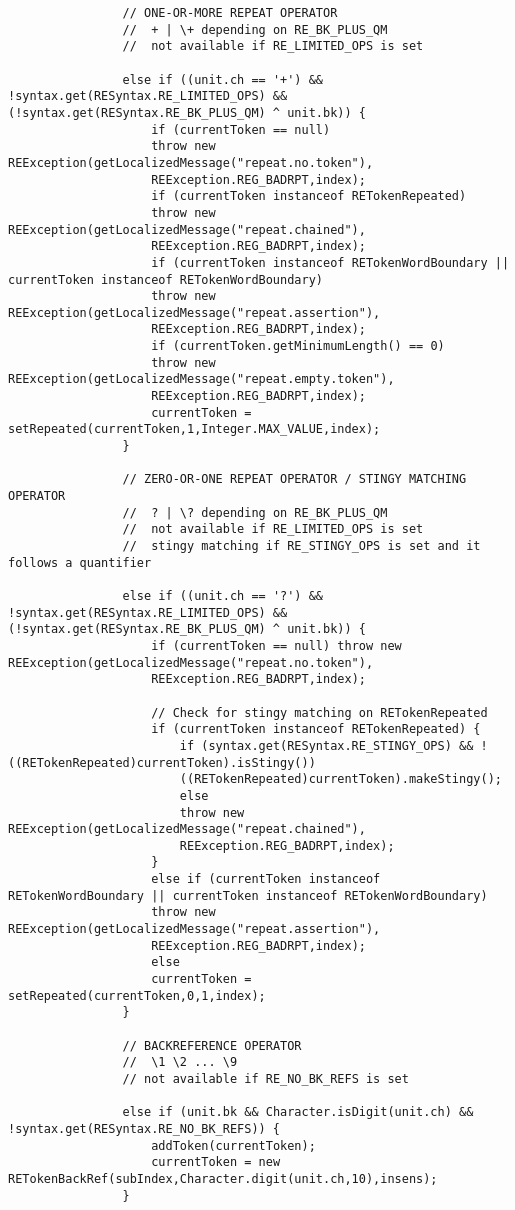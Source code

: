 \begin{mdframed}
\begin{lstlisting}
				// ONE-OR-MORE REPEAT OPERATOR
				//  + | \+ depending on RE_BK_PLUS_QM
				//  not available if RE_LIMITED_OPS is set
				
				else if ((unit.ch == '+') && !syntax.get(RESyntax.RE_LIMITED_OPS) && (!syntax.get(RESyntax.RE_BK_PLUS_QM) ^ unit.bk)) {
					if (currentToken == null)
					throw new REException(getLocalizedMessage("repeat.no.token"),
					REException.REG_BADRPT,index);
					if (currentToken instanceof RETokenRepeated)
					throw new REException(getLocalizedMessage("repeat.chained"),
					REException.REG_BADRPT,index);
					if (currentToken instanceof RETokenWordBoundary || currentToken instanceof RETokenWordBoundary)
					throw new REException(getLocalizedMessage("repeat.assertion"),
					REException.REG_BADRPT,index);
					if (currentToken.getMinimumLength() == 0)
					throw new REException(getLocalizedMessage("repeat.empty.token"),
					REException.REG_BADRPT,index);
					currentToken = setRepeated(currentToken,1,Integer.MAX_VALUE,index);
				}
				
				// ZERO-OR-ONE REPEAT OPERATOR / STINGY MATCHING OPERATOR
				//  ? | \? depending on RE_BK_PLUS_QM
				//  not available if RE_LIMITED_OPS is set
				//  stingy matching if RE_STINGY_OPS is set and it follows a quantifier
				
				else if ((unit.ch == '?') && !syntax.get(RESyntax.RE_LIMITED_OPS) && (!syntax.get(RESyntax.RE_BK_PLUS_QM) ^ unit.bk)) {
					if (currentToken == null) throw new REException(getLocalizedMessage("repeat.no.token"),
					REException.REG_BADRPT,index);
					
					// Check for stingy matching on RETokenRepeated
					if (currentToken instanceof RETokenRepeated) {
						if (syntax.get(RESyntax.RE_STINGY_OPS) && !((RETokenRepeated)currentToken).isStingy())
						((RETokenRepeated)currentToken).makeStingy();
						else
						throw new REException(getLocalizedMessage("repeat.chained"),
						REException.REG_BADRPT,index);
					}
					else if (currentToken instanceof RETokenWordBoundary || currentToken instanceof RETokenWordBoundary)
					throw new REException(getLocalizedMessage("repeat.assertion"),
					REException.REG_BADRPT,index);
					else
					currentToken = setRepeated(currentToken,0,1,index);
				}
				
				// BACKREFERENCE OPERATOR
				//  \1 \2 ... \9
				// not available if RE_NO_BK_REFS is set
				
				else if (unit.bk && Character.isDigit(unit.ch) && !syntax.get(RESyntax.RE_NO_BK_REFS)) {
					addToken(currentToken);
					currentToken = new RETokenBackRef(subIndex,Character.digit(unit.ch,10),insens);
				}
				

\end{lstlisting}
\end{mdframed}
